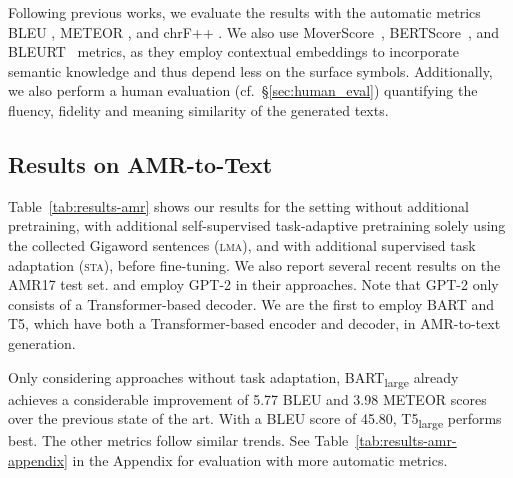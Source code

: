 \documentclass[11pt,a4paper]{article}
\begin{document}
\begin{table*}[t]
Following previous works, we evaluate the results with the automatic metrics BLEU \cite{Papineni:2002:BMA:1073083.1073135}, METEOR \cite{Denkowski14meteoruniversal}, and chrF++ \cite{popovic-2015-chrf}. We also use MoverScore~\cite{zhao-etal-2019-moverscore}, BERTScore~\cite{bert-score}, and BLEURT~\cite{sellam-etal-2020-bleurt} metrics, as they employ contextual embeddings to incorporate semantic knowledge and thus depend less on the surface symbols. Additionally, we also perform a human evaluation (cf.\ \S\ref{sec:human_eval}) quantifying the fluency, fidelity and meaning similarity of the generated texts.






\subsection{Results on AMR-to-Text}

Table~\ref{tab:results-amr} shows our results for the setting without additional pretraining, with additional self-supervised task-adaptive pretraining solely using the collected Gigaword sentences (\textsc{lma}), and with additional supervised task adaptation (\textsc{sta}), before fine-tuning. We also report several recent results on the AMR17 test set. \citet{mager2020gpttoo} and \citet{harkous2020text} employ GPT-2 in their approaches. Note that GPT-2 only consists of a Transformer-based decoder. We are the first to employ BART and T5, which have both a Transformer-based encoder and decoder, in AMR-to-text generation.

Only considering approaches without task adaptation, BART\textsubscript{large} already achieves a considerable improvement of 5.77 BLEU and 3.98 METEOR scores over the previous state of the art. With a BLEU score of 45.80, T5\textsubscript{large} performs best.
The other metrics follow similar trends. See Table~\ref{tab:results-amr-appendix} in the Appendix for evaluation with more automatic metrics. 




\end{table*}
\end{document}
